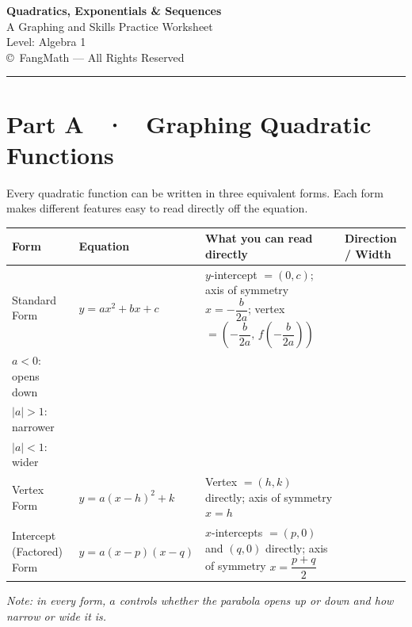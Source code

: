 \documentclass[11pt]{article}
\begin{document}
\begin{center}
  {\Huge\bfseries\color{brandred} Quadratics, Exponentials \& Sequences}\\[2mm]
  {\large\color{brandblue} A Graphing and Skills Practice Worksheet}\\[1mm]
  {\small Level: Algebra 1}\\[2mm]
  {\small \copyright\ FangMath --- All Rights Reserved}
\end{center}

\vspace{2mm}
\hrule
\vspace{3mm}

\section*{Part A \ · \ Graphing Quadratic Functions}

Every quadratic function can be written in three equivalent forms. Each form makes different features easy to read directly off the equation.

\begin{center}
\renewcommand{\arraystretch}{1.5}
{\small
\begin{tabular}{|>{\raggedright\arraybackslash}p{2.6cm}|>{\raggedright\arraybackslash}p{3.1cm}|>{\raggedright\arraybackslash}p{5.4cm}|>{\raggedright\arraybackslash}p{3.4cm}|}
\hline
\rowcolor{lightblue}
\textbf{Form} & \textbf{Equation} & \textbf{What you can read directly} & \textbf{Direction / Width}\\
\hline
Standard Form & $y = ax^2 + bx + c$ & $y$-intercept $= (0,c)$; axis of symmetry $x = -\dfrac{b}{2a}$; vertex $= \left(-\dfrac{b}{2a},\, f\!\left(-\dfrac{b}{2a}\right)\right)$ & \multirow{3}{3.4cm}{$a>0$: opens up\\ $a<0$: opens down\\ $|a|>1$: narrower\\ $|a|<1$: wider}\\
\cline{1-3}
Vertex Form & $y = a(x-h)^2 + k$ & Vertex $=(h,k)$ directly; axis of symmetry $x = h$ & \\
\cline{1-3}
Intercept (Factored) Form & $y = a(x-p)(x-q)$ & $x$-intercepts $=(p,0)$ and $(q,0)$ directly; axis of symmetry $x = \dfrac{p+q}{2}$ & \\
\hline
\end{tabular}
}
\end{center}

\textit{Note: in every form, $a$ controls whether the parabola opens up or down and how narrow or wide it is.}
\end{document}
